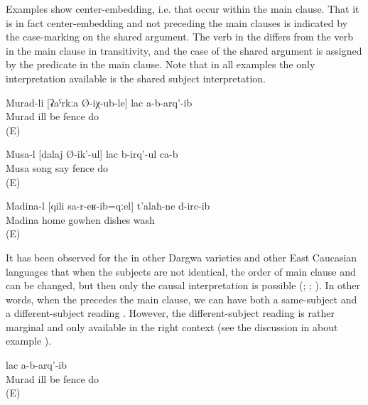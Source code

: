 Examples  show center-embedding, i.e.  that occur within the main clause. That it is in fact center-embedding and not  preceding the main clauses is indicated by the case-marking on the shared argument. The verb in the  differs from the verb in the main clause in transitivity, and the case of the shared argument is assigned by the predicate in the main clause. Note that in all examples the only interpretation available is the shared subject interpretation. 
%
\begin{exe}
	\ex	\label{ex:‎When / Because Murad got ill he did not build the fence}
	\gll	Murad-li	[ʡaˁrkːa	Ø-iχ-ub-le]	lac	a-b-arq'-ib\\
		Murad	ill	be	fence	do\\
	\glt	{} (E)

	\ex	\label{ex:Musa is singing a song and building the fence}
	\gll	Musa-l	[dalaj	Ø-ik'-ul]	lac	b-irq'-ul	ca-b\\
		Musa	song	say	fence	do	\\
	\glt	{} (E)

	\ex	\label{ex:‎Madina, having come home, washed the dishes}
	\gll	Madina-l	[qili	sa-r-eʁ-ib=qːel]	t'alaħ-ne	d-irc-ib\\
		Madina	home	gowhen	dishes	wash\\
	\glt	{} (E)
\end{exe}

It has been observed for the  in other Dargwa varieties and other East Caucasian languages that when the subjects are not identical, the order of main clause and  can be changed, but then only the causal interpretation is possible (\citealp{Belyaev2010}; \citealp{Kustova2015}; \citealp{Kazenin.Testelets2004}). In other words, when the  precedes the main clause, we can have both a same-subject and a different-subject reading . However, the different-subject reading is rather marginal and only available in the right context (see the discussion in  about example ).
%
\begin{exe}
	\ex	\label{ex:‎When / Because Murad got ill he (= Murad or some other person) did not build the fence}
		lac	a-b-arq'-ib\\
		Murad	ill	be	fence	do\\
	\glt	{} (E)
\end{exe}

